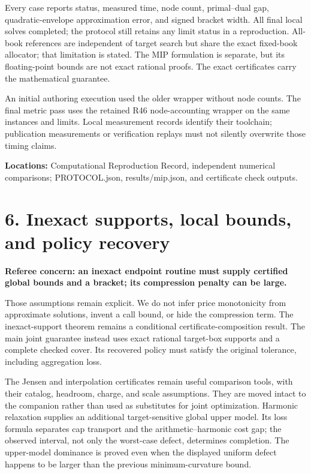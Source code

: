 \documentclass[11pt,letterpaper]{article}
\begin{document}
Every case reports status, measured time, node count, primal--dual gap, quadratic-envelope approximation error, and signed bracket width. All final local solves completed; the protocol still retains any limit status in a reproduction. All-book references are independent of target search but share the exact fixed-book allocator; that limitation is stated. The MIP formulation is separate, but its floating-point bounds are not exact rational proofs. The exact certificates carry the mathematical guarantee.



An initial authoring execution used the older wrapper without node counts. The final metric pass uses the retained R46 node-accounting wrapper on the same instances and limits. Local measurement records identify their toolchain; publication measurements or verification replays must not silently overwrite those timing claims.



\textbf{Locations:} Computational Reproduction Record, independent numerical comparisons; PROTOCOL.json, results/mip.json, and certificate check outputs.



\section*{6. Inexact supports, local bounds, and policy recovery}


\textbf{Referee concern: an inexact endpoint routine must supply certified global bounds and a bracket; its compression penalty can be large.}



Those assumptions remain explicit. We do not infer price monotonicity from approximate solutions, invent a call bound, or hide the compression term. The inexact-support theorem remains a conditional certificate-composition result. The main joint guarantee instead uses exact rational target-box supports and a complete checked cover. Its recovered policy must satisfy the original tolerance, including aggregation loss.



The Jensen and interpolation certificates remain useful comparison tools, with their catalog, headroom, charge, and scale assumptions. They are moved intact to the companion rather than used as substitutes for joint optimization. Harmonic relaxation supplies an additional target-sensitive global upper model. Its loss formula separates cap transport and the arithmetic--harmonic cost gap; the observed interval, not only the worst-case defect, determines completion. The upper-model dominance is proved even when the displayed uniform defect happens to be larger than the previous minimum-curvature bound.
\end{document}
